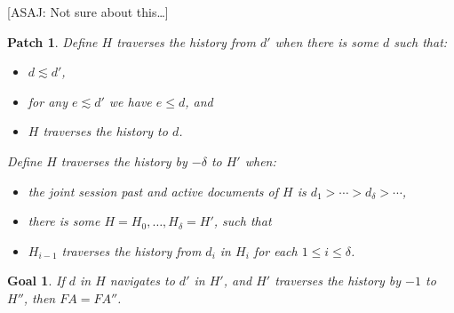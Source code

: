 \documentclass{notes}
\newcommand{\aNH}{H}
\newcommand{\FullyActive}{F\!A}
\newcommand{\leChron}{\le}
\newcommand{\gtChron}{>}
\newcommand{\ltSess}{\lesssim}
\newcommand{\aDoc}{d}
\newcommand{\bDoc}{e}
\newtheorem{goal}{Goal}
\newtheorem{patch}{Patch}
\newtheorem{counterexample}{Counterexample}
\begin{document}
[ASAJ: Not sure about this\dots]

\begin{patch}
Define \emph{$\aNH$ traverses the history from $\aDoc'$} when there is some $\aDoc$ such that:
\begin{itemize}
\item $\aDoc\ltSess\aDoc'$,
\item for any $\bDoc\ltSess\aDoc'$ we have $\bDoc\leChron\aDoc$, and
\item $\aNH$ traverses the history to $\aDoc$.
\end{itemize}
Define \emph{$\aNH$ traverses the history by $-\delta$ to $\aNH'$} when:
\begin{itemize}
\item the joint session past and active documents of $\aNH$ is $\aDoc_1 \gtChron \cdots \gtChron \aDoc_\delta \gtChron \cdots$,
\item there is some $\aNH=\aNH_0,\ldots,\aNH_\delta=\aNH'$, such that
\item $H_{i-1}$ traverses the history from $d_i$ in $H_i$ for each $1 \le i \le \delta$.
\end{itemize}
\end{patch}

\begin{goal}
  If $\aDoc$ in $\aNH$ navigates to $\aDoc'$ in $\aNH'$,
  and $\aNH'$ traverses the history by $-1$ to $\aNH''$,
  then $\FullyActive=\FullyActive''$.
\end{goal}

\end{document}
